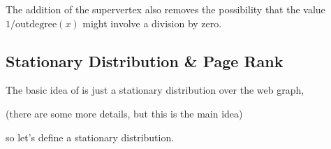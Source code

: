 \bigskip\centerline{
  \hspace{2cm}
}\bigskip

The addition of the supervertex also removes the possibility that the value
$1/\text{outdegree}(x)$ might involve a division by zero.

\subsection{Stationary Distribution \& Page Rank}

The basic idea of  is just a stationary distribution over
the web graph,
\begin{staffnotes}
(there are some more details, but this is the main idea)
\end{staffnotes}
so let's define a stationary distribution.

